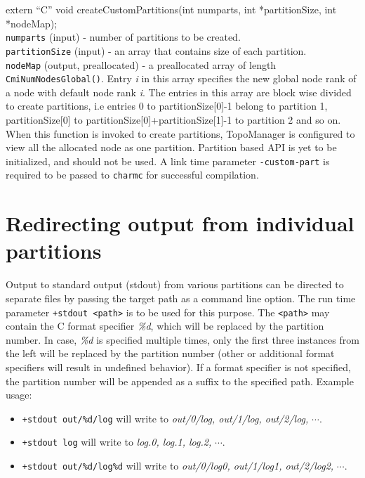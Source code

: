 \begin{itemize}
extern ``C'' void createCustomPartitions(int numparts, int *partitionSize, int *nodeMap);\\
{\tt numparts} (input) - number of partitions to be created. \\
{\tt partitionSize} (input) - an array that contains size of each partition. \\
{\tt nodeMap} (output, preallocated) - a preallocated array of length {\tt CmiNumNodesGlobal()}.
Entry \emph{i} in this array specifies the new global node rank of a node with default node rank \emph{i}. 
The entries in this array are block wise divided to create partitions, i.e entries 0 to 
partitionSize[0]-1 belong to partition 1, partitionSize[0] to
partitionSize[0]+partitionSize[1]-1 to partition 2 and so on.\\

When this function is invoked to create partitions, TopoManager is configured to 
view all the allocated node as one partition. Partition based API is yet to be 
initialized, and should not be used. A link time parameter {\tt -custom-part} 
is required to be passed to {\tt charmc} for successful compilation.
\end{itemize}

\section{Redirecting output from individual partitions}
Output to standard output (stdout) from various partitions can be directed 
to separate files by passing the target path as a command line option. The run
time parameter {\tt +stdout <path>} is to be used for this purpose. The
{\tt <path>} may contain the C format specifier \emph{\%d}, which will be replaced by the
partition number. In case, \emph{\%d} is specified multiple times, only the first
three instances from the left will be replaced by the partition number (other or additional format specifiers will result in undefined behavior). If a format specifier is not specified, 
the partition number will be appended as a suffix to the specified path. Example usage:

\begin{itemize}
\item {\tt +stdout out/\%d/log} will write to \emph{out/0/log, out/1/log,
out/2/log,} $\cdots$.
\item {\tt +stdout log} will write to \emph{log.0, log.1, log.2,} $\cdots$.
\item {\tt +stdout out/\%d/log\%d} will write to \emph{out/0/log0, out/1/log1,
out/2/log2,} $\cdots$.
\end{itemize}

